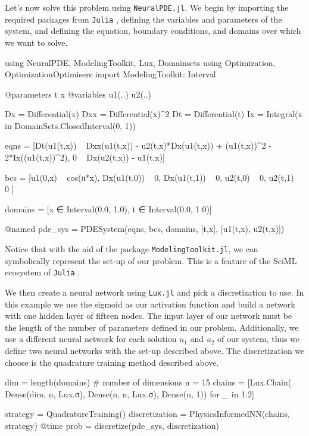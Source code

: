 \documentclass{CUP-JNL-DTM}%
\theoremstyle{definition}
\numberwithin{equation}{section}
\newcommand{\Julia}{\texttt{Julia} }
\begin{document}
Let's now solve this problem using \texttt{NeuralPDE.jl}. We begin by importing the required packages from \Julia, defining the variables and parameters of the system, and defining the equation, boundary conditions, and domains over which we want to solve. 

\begin{jllisting}
using NeuralPDE, ModelingToolkit, Lux, Domainsets
using Optimization, OptimizationOptimisers
import ModelingToolkit: Interval

@parameters t x
@variables u1(..) u2(..)

Dx = Differential(x)
Dxx = Differential(x)^2
Dt = Differential(t)
Ix = Integral(x in DomainSets.ClosedInterval(0, 1))

eqns = [Dt(u1(t,x)) ~ Dxx(u1(t,x)) - u2(t,x)*Dx(u1(t,x)) + 
                                        (u1(t,x))^2 - 2*Ix((u1(t,x))^2),
        0 ~ Dx(u2(t,x)) - u1(t,x)]

bcs = [u1(0,x) ~ cos(π*x),
        Dx(u1(t,0)) ~ 0,
        Dx(u1(t,1)) ~ 0,
        u2(t,0) ~ 0,
        u2(t,1) ~ 0
]

domains = [x ∈ Interval(0.0, 1.0),
            t ∈ Interval(0.0, 1.0)]

@named pde_sys = PDESystem(eqns, bcs, domains, [t,x], [u1(t,x), u2(t,x)])
\end{jllisting}
Notice that with the aid of the package \texttt{ModelingToolkit.jl}, we can symbolically represent the set-up of our problem. This is a feature of the SciML ecosystem of \Julia. 

We then create a neural network using \texttt{Lux.jl} and pick a discretization to use. In this example we use the sigmoid as our activation function and build a network with one hidden layer of fifteen nodes. The input layer of our network must be the length of the number of parameters defined in our problem. Additionally, we use a different neural network for each solution $u_1$ and $u_2$ of our system, thus we define two neural networks with the set-up described above. The discretization we choose is the quadrature training method described above. 

\begin{jllisting}
dim = length(domains) # number of dimensions
n = 15
chains = [Lux.Chain(
            Dense(dim, n, Lux.σ), 
            Dense(n, n, Lux.σ), 
            Dense(n, 1)) for _ in 1:2]

strategy = QuadratureTraining()
discretization = PhysicsInformedNN(chains, strategy)
@time prob = discretize(pde_sys, discretization)
\end{jllisting}
\end{document}
